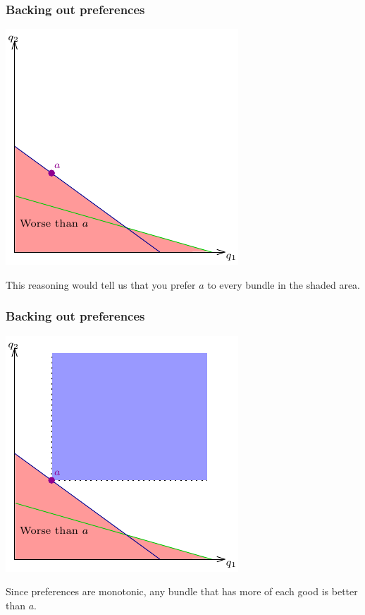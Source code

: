 \documentclass[xcolor=pdftex,dvipsnames]{beamer}
\begin{document}
\begin{frame}
\frametitle{Backing out preferences}
\begin{center}
\includegraphics{pics/RevPref3}
\end{center}
This reasoning would tell us that you prefer $a$ to every bundle in
the shaded area.
\end{frame}

\begin{frame}
\frametitle{Backing out preferences}
\begin{center}
\includegraphics{pics/RevPref4}
\end{center}
Since preferences are monotonic, any bundle that has more of each good
is better than $a$.




\end{frame}
\end{document}
